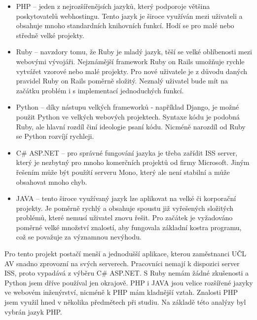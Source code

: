             \begin{itemize}
                \item PHP – jeden z nejrozšířenějsích jazyků, který podporoje většina poskytovatelů webhostingu. Tento jazyk je široce využíván mezi uživateli a obsahuje mnoho standardních knihovních funkcí. Hodí se pro malé nebo středně velké projekty.
                
                \item Ruby – navzdory tomu, že Ruby je mladý jazyk, těší se velké oblíbenosti mezi webovými vývojáři. Nejznámější framework Ruby on Rails umožňuje rychle vytvářet vzorové nebo malé projekty. Pro nové uživatele je z důvodu daných pravidel Ruby on Rails poměrně složitý. Neznalý uživatel bude mít na začátku problém i s implementací jednoduchých funkcí.
                
                \item Python – díky nástupu velkých frameworků - například Django, je možné použit Python ve velkých webových projektech. Syntaxe kódu je podobná Ruby, ale hlavní rozdíl činí ideologie psaní kódu. Nicméně narozdíl od Ruby se Python rozvíjí rychleji.
                
                \item C\# ASP.NET – pro správné fungování jazyka je třeba zařídit ISS server, který je nezbytný pro mnoho komerčních projektů od firmy Microsoft. Jiným řešením může být použítí serveru Mono, který ale není stabilní a může obsahovat mnoho chyb.
                
                \item JAVA – tento široce využívaný jazyk lze aplikovat na velké či korporační projekty. Je poměrně rychlý a obsahuje spoustu již vyřešených složitých problémů, které nemusí uživatel znovu řešit. Pro začátek je vyžadováno poměrné velké množství znalostí, aby fungovala základní kostra programu, což se považuje za významnou nevýhodu.
            \end{itemize}

            Pro tento projekt postačí menší a jednodušší aplikace, kterou zaměstnanci UČL AV snadno zprovozní na svých serverech. Pracovníci nemají k dispozici server ISS, proto vypadává z výběru C\# ASP.NET. S Ruby nemám žádné zkušenosti a Python jsem dříve používal jen okrajově. PHP i JAVA jsou velice rozšířené jazyky ve webovém inženýrství, nicméně k PHP mám kladnější vztah. Znalosti PHP jsem využil hned v několika předmětech při studiu. Na základě této analýzy byl vybrán jazyk PHP.
            

